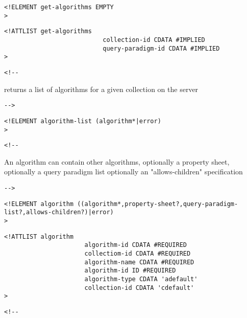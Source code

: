 \begin{verbatim}
<!ELEMENT get-algorithms EMPTY 
>\end{verbatim}

\begin{verbatim}
<!ATTLIST get-algorithms 
                           collection-id CDATA #IMPLIED
                           query-paradigm-id CDATA #IMPLIED
>\end{verbatim}

\begin{verbatim}<!--\end{verbatim}
   


     returns a list of algorithms for a given collection on the server 

       
 \begin{verbatim}-->\end{verbatim}



\begin{verbatim}
<!ELEMENT algorithm-list (algorithm*|error) 
>\end{verbatim}

\begin{verbatim}<!--\end{verbatim}
   

     An algorithm can contain 
     other algorithms,
     optionally a property sheet,
     optionally a query paradigm list
     optionally an "allows-children" specification

       
 \begin{verbatim}-->\end{verbatim}



\begin{verbatim}
<!ELEMENT algorithm ((algorithm*,property-sheet?,query-paradigm-list?,allows-children?)|error) 
>\end{verbatim}

\begin{verbatim}
<!ATTLIST algorithm 
                      algorithm-id CDATA #REQUIRED
                      collectiom-id CDATA #REQUIRED
                      algorithm-name CDATA #REQUIRED
                      algorithm-id ID #REQUIRED
                      algorithm-type CDATA 'adefault'
                      collection-id CDATA 'cdefault'
>\end{verbatim}

\begin{verbatim}<!--\end{verbatim}
   


